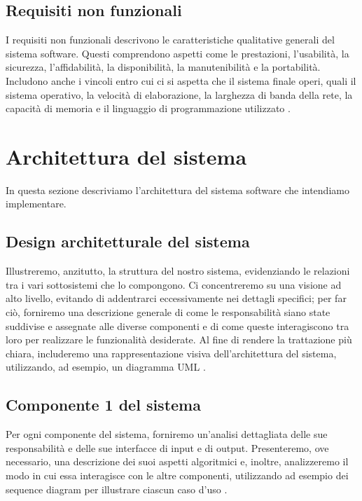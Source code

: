\subsection{Requisiti non funzionali}

I requisiti non funzionali descrivono le caratteristiche qualitative generali del sistema software. Questi comprendono aspetti come le prestazioni, l'usabilità, la sicurezza, l'affidabilità, la disponibilità, la manutenibilità e la portabilità. Includono anche i vincoli entro cui ci si aspetta che il sistema finale operi, quali il sistema operativo, la velocità di elaborazione, la larghezza di banda della rete, la capacità di memoria e il linguaggio di programmazione utilizzato \cite{wah2009pedia}.

\section{Architettura del sistema}

In questa sezione descriviamo l'architettura del sistema software che intendiamo implementare.

\subsection{Design architetturale del sistema}

Illustreremo, anzitutto, la struttura del nostro sistema, evidenziando le relazioni tra i vari sottosistemi che lo compongono. Ci concentreremo su una visione ad alto livello, evitando di addentrarci eccessivamente nei dettagli specifici;  per far ciò, forniremo una descrizione generale di come le responsabilità siano state suddivise e assegnate alle diverse componenti e di come queste interagiscono tra loro per realizzare le funzionalità desiderate. Al fine di rendere la trattazione più chiara, includeremo una rappresentazione visiva dell'architettura del sistema, utilizzando, ad esempio, un diagramma UML \cite{harran2023design}.

\subsection{Componente 1 del sistema}

Per ogni componente del sistema, forniremo un'analisi dettagliata delle sue responsabilità e delle sue interfacce di input e di output. Presenteremo, ove necessario, una descrizione dei suoi aspetti algoritmici e, inoltre, analizzeremo il modo in cui essa interagisce con le altre componenti, utilizzando ad esempio dei sequence diagram per illustrare ciascun caso d'uso \cite{harran2023design}.

